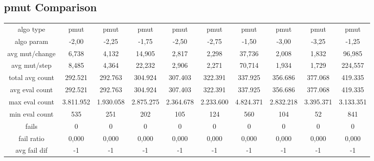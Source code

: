 \subsection{pmut Comparison}
\begin{tabular}[h]{cccccccccc}
algo type&                pmut&         pmut&         pmut&         pmut&         pmut&         pmut&         pmut&         pmut&         pmut\\
algo param&              -2,00&        -2,25&        -1,75&        -2,50&        -2,75&        -1,50&        -3,00&        -3,25&        -1,25\\
avg mut/change&          6,738&        4,132&       14,905&        2,817&        2,298&       37,736&        2,008&        1,832&       96,985\\
avg mut/step&            8,485&        4,364&       22,232&        2,906&        2,271&       70,714&        1,934&        1,729&      224,557\\
\hline
total avg count&       292.521&      292.763&      304.924&      307.403&      322.391&      337.925&      356.686&      377.068&      419.335\\
avg eval count&        292.521&      292.763&      304.924&      307.403&      322.391&      337.925&      356.686&      377.068&      419.335\\
max eval count&      3.811.952&    1.930.058&    2.875.275&    2.364.678&    2.233.600&    4.824.371&    2.832.218&    3.395.371&    3.133.351\\
min eval count&            535&          251&          202&          105&          124&          560&          104&           52&          841\\
\hline
fails&                       0&            0&            0&            0&            0&            0&            0&            0&            0\\
fail ratio&              0,000&        0,000&        0,000&        0,000&        0,000&        0,000&        0,000&        0,000&        0,000\\
avg fail dif&               -1&           -1&           -1&           -1&           -1&           -1&           -1&           -1&           -1\\
\end{tabular}
